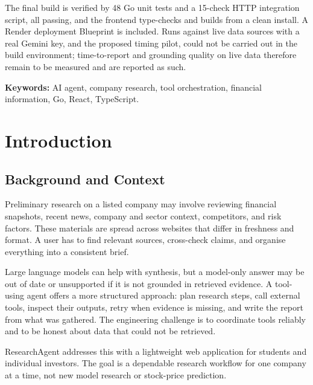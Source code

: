 \documentclass[12pt,a4paper,oneside]{report}
\begin{document}
The final build is verified by 48 Go unit tests and a 15-check HTTP integration script, all passing, and the frontend type-checks and builds from a clean install. A Render deployment Blueprint is included. Runs against live data sources with a real Gemini key, and the proposed timing pilot, could not be carried out in the build environment; time-to-report and grounding quality on live data therefore remain to be measured and are reported as such.

\noindent\textbf{Keywords:} AI agent, company research, tool orchestration, financial information, Go, React, TypeScript.

\tableofcontents
\listoffigures
\listoftables
\clearpage
{}

\chapter{Introduction}
\section{Background and Context}
Preliminary research on a listed company may involve reviewing financial snapshots, recent news, company and sector context, competitors, and risk factors. These materials are spread across websites that differ in freshness and format. A user has to find relevant sources, cross-check claims, and organise everything into a consistent brief.

Large language models can help with synthesis, but a model-only answer may be out of date or unsupported if it is not grounded in retrieved evidence. A tool-using agent offers a more structured approach: plan research steps, call external tools, inspect their outputs, retry when evidence is missing, and write the report from what was gathered. The engineering challenge is to coordinate tools reliably and to be honest about data that could not be retrieved.

ResearchAgent addresses this with a lightweight web application for students and individual investors. The goal is a dependable research workflow for one company at a time, not new model research or stock-price prediction.
\end{document}

